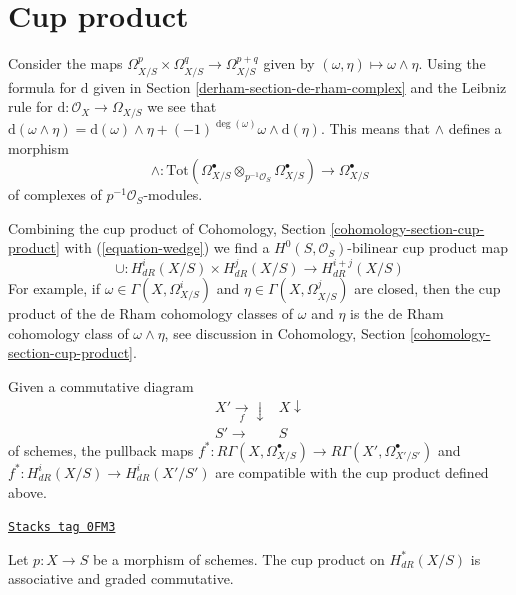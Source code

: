 \section{Cup product}
\label{derham-section-cup-product}
Consider the maps
$\Omega^p_{X/S} \times \Omega^q_{X/S} \to \Omega^{p + q}_{X/S}$
given by $(\omega , \eta) \longmapsto \omega \wedge \eta$.
Using the formula for $\text{d}$ given in Section \ref{derham-section-de-rham-complex}
and the Leibniz rule for $\text{d} : \mathcal{O}_X \to \Omega_{X/S}$
we see that $\text{d}(\omega \wedge \eta) = \text{d}(\omega) \wedge \eta +
(-1)^{\deg(\omega)} \omega \wedge \text{d}(\eta)$. This means that
$\wedge$ defines a morphism
\begin{equation}
\label{equation-wedge}
\wedge :
\text{Tot}(
\Omega^\bullet_{X/S} \otimes_{p^{-1}\mathcal{O}_S} \Omega^\bullet_{X/S})
\longrightarrow
\Omega^\bullet_{X/S}
\end{equation}
of complexes of $p^{-1}\mathcal{O}_S$-modules.

\medskip\noindent
Combining the cup product of
Cohomology, Section \ref{cohomology-section-cup-product}
with (\ref{equation-wedge}) we find a
$H^0(S, \mathcal{O}_S)$-bilinear cup product map
$$
\cup : H^i_{dR}(X/S) \times H^j_{dR}(X/S) \longrightarrow H^{i + j}_{dR}(X/S)
$$
For example, if $\omega \in \Gamma(X, \Omega^i_{X/S})$ and
$\eta \in \Gamma(X, \Omega^j_{X/S})$ are closed, then
the cup product of the de Rham cohomology classes of
$\omega$ and $\eta$ is the de Rham cohomology class of $\omega \wedge \eta$,
see discussion in Cohomology, Section \ref{cohomology-section-cup-product}.

\medskip\noindent
Given a commutative diagram
$$
\begin{array}{cc}X' \underset{f}{\longrightarrow}\downarrow & X \downarrow \\ S' \longrightarrow & S\end{array}
$$
of schemes, the pullback maps
$f^* : R\Gamma(X, \Omega^\bullet_{X/S}) \to R\Gamma(X', \Omega^\bullet_{X'/S'})$
and
$f^* : H^i_{dR}(X/S) \longrightarrow H^i_{dR}(X'/S')$
are compatible with the cup product defined above.

\begin{lemma}
\label{derham-lemma-cup-product-graded-commutative}
\href{https://stacks.math.columbia.edu/tag/0FM3}{\texttt{Stacks tag 0FM3}}

Let $p : X \to S$ be a morphism of schemes.
The cup product on $H^*_{dR}(X/S)$ is associative and
graded commutative.
\end{lemma}

